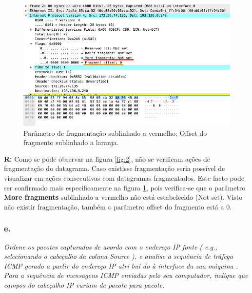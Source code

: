 \documentclass{llncs}
\begin{document}
\begin{figure}[H]
\begin{center}
\includegraphics[scale=0.45]{2_d.png} 
\end{center}
\caption{\label{fig:2_d}Parâmetro de fragmentação sublinhado a vermelho; Offset do fragmento sublinhado a laranja.}
\end{figure}
\textbf{R:} Como se pode observar na figura \ref{fig:2}, não se verificam ações de fragmentação do datagrama. Caso existisse fragmentação seria possível de visualizar em ações consecutivas com datagramas fragmentados. Este facto pode ser confirmado mais especificamente na figura \ref{fig:2_d}, pois verifica-se que o parâmetro \textbf{More fragments} sublinhado a vermelho não está estabelecido (Not set). Visto não existir fragmentação, também o parâmetro offset do fragmento está a 0.

\subsubsection{e.}
\emph{Ordene os pacotes capturados de acordo com o endereço IP fonte (
e.g.,
selecionando 
o  cabeçalho  da  coluna 
Source
),  e 
analise  a  sequência  de 
tráfego ICMP
gerado a partir
do endereço 
IP 
atri
buí
do à
interface da 
sua 
máquina
.
Para  a
sequência
de  mensagens 
ICMP 
enviadas  pelo  seu 
computador, indique que campos do cabeçalho IP variam de pacote para 
pacote.}
\end{document}
